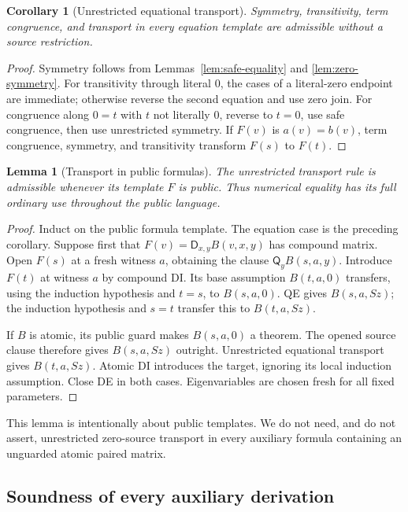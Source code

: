 \documentclass[11pt,letterpaper]{article}
\newtheorem{lemma}[theorem]{Lemma}
\newtheorem{corollary}[theorem]{Corollary}
\theoremstyle{definition}
\newcommand{\D}{\mathsf D}
\newcommand{\Q}{\mathsf Q}
\begin{document}
\begin{corollary}[Unrestricted equational transport]
Symmetry, transitivity, term congruence, and transport in every equation
template are admissible without a source restriction.
\end{corollary}
\begin{proof}
Symmetry follows from Lemmas~\ref{lem:safe-equality} and
\ref{lem:zero-symmetry}.  For transitivity through literal $0$, the
cases of a literal-zero endpoint are immediate; otherwise reverse the
second equation and use zero join.  For congruence along $0=t$ with
$t$ not literally $0$, reverse to $t=0$, use safe congruence, then
use unrestricted symmetry.  If $F(v)$ is $a(v)=b(v)$, term
congruence, symmetry, and transitivity transform $F(s)$ to $F(t)$.
\end{proof}

\begin{lemma}[Transport in public formulas]\label{lem:public-transport}
The unrestricted transport rule is admissible whenever its template $F$
is public.  Thus numerical equality has its full ordinary use throughout
the public language.
\end{lemma}
\begin{proof}
Induct on the public formula template.  The equation case is the preceding
corollary.  Suppose first that $F(v)=\D_{x,y}B(v,x,y)$ has compound
matrix.  Open $F(s)$ at a fresh witness $a$, obtaining the clause
$\Q_y B(s,a,y)$.  Introduce $F(t)$ at witness $a$ by compound DI.
Its base assumption $B(t,a,0)$ transfers, using the induction hypothesis
and $t=s$, to $B(s,a,0)$.  QE gives $B(s,a,Sz)$; the induction
hypothesis and $s=t$ transfer this to $B(t,a,Sz)$.

If $B$ is atomic, its public guard makes $B(s,a,0)$ a theorem.
The opened source clause therefore gives $B(s,a,Sz)$ outright.
Unrestricted equational transport gives $B(t,a,Sz)$.  Atomic DI
introduces the target, ignoring its local induction assumption.
Close DE in both cases.  Eigenvariables are chosen fresh for all fixed
parameters.
\end{proof}

This lemma is intentionally about public templates.  We do not need, and
do not assert, unrestricted zero-source transport in every auxiliary
formula containing an unguarded atomic paired matrix.

\subsection{Soundness of every auxiliary derivation}
\end{document}
